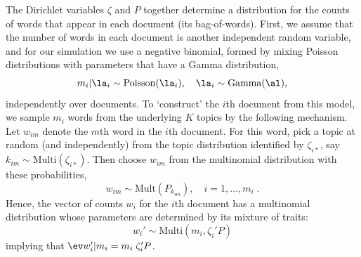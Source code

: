 \documentclass[10pt]{article}
\begin{document}
 
The Dirichlet variables $\zeta$ and $P$ together determine a distribution for the counts of words that appear in each document (its bag-of-words).  First, we assume that the number of words in each document is another independent random variable, and for our simulation we use a negative binomial, formed by mixing Poisson distributions with parameters that have a Gamma distribution,
\begin{equation}
  m_i|\la_i \sim \mbox{Poisson}(\la_i), \quad \la_i \sim \mbox{Gamma}(\al),
\end{equation}
independently over documents.  To `construct' the $i$th document from this model, we sample $m_i$ words from the underlying $K$ topics by the following mechanism.  Let $w_{im}$ denote the $m$th word in the $i$th document.  For this word, pick a topic at random (and independently) from the topic distribution identified by $\zeta_{i*}$, say $k_{im} \sim \mbox{Multi}(\zeta_{i*})$.  Then choose $w_{im}$ from the multinomial distribution with these probabilities, 
\begin{equation}
  w_{im} \sim \mbox{Mult}(P_{k_{im}}), \quad i = 1,\ldots,m_i \;.
  \label{eq:wim}
\end{equation}
Hence, the vector of counts $w_i$ for the $i$th document has a multinomial distribution whose parameters are determined by its mixture of traits:
 \begin{equation}
   w_i' \sim \mbox{Multi}(m_i, \zeta_i' P)   
 \label{eq:di}
 \end{equation}
 implying that $\ev w_i' | m_i = m_i \; \zeta_i'P$.  
 
 
\end{document}
